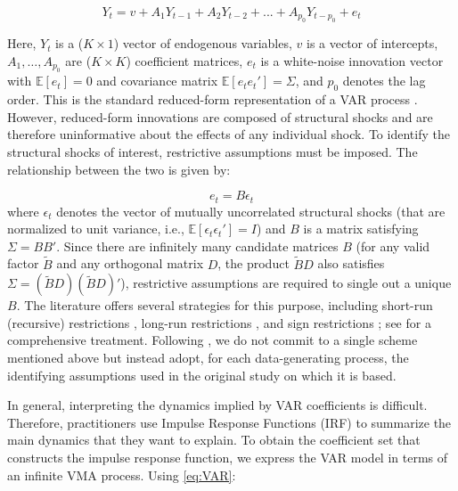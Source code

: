 \documentclass[12pt, a4paper]{article}
\begin{document}
\begin{equation} \label{eq:VAR}
    Y_t = v + A_{1}Y_{t-1}+A_2Y_{t-2}+...+A_{p_0}Y_{t-p_0}+e_t
\end{equation}

Here, $Y_t$ is a ($K \times 1$) vector of endogenous variables, $v$ is a vector of intercepts, $A_1, \dots, A_{p_0}$ are ($K \times K$) coefficient matrices, $e_t$ is a white-noise innovation vector with $\mathbb{E}[e_t] = 0$ and covariance matrix $\mathbb{E}[e_t e_t'] = \Sigma$, and $p_0$ denotes the lag order. This is the standard reduced-form representation of a VAR process \citep{lutkepohlNewIntroductionMultiple2005,simsMacroeconomicsReality1980}. However, reduced-form innovations are composed of structural shocks and are therefore uninformative about the effects of any individual shock. To identify the structural shocks of interest, restrictive assumptions must be imposed. The relationship between the two is given by:

\begin{equation} \label{eq:VAR_error}
    e_t = B \epsilon_t
\end{equation}
where $\epsilon_t$ denotes the vector of mutually uncorrelated structural shocks (that are normalized to unit variance, i.e., $\mathbb{E}[\epsilon_t \epsilon_t'] = I$) and $B$ is a matrix satisfying $\Sigma = BB'$. Since there are infinitely many candidate matrices $B$ (for any valid factor $\tilde{B}$ and any orthogonal matrix $D$, the product $\tilde{B} D$ also satisfies $\Sigma = (\tilde{B} D)(\tilde{B} D)'$), restrictive assumptions are required to single out a unique $B$. The literature offers several strategies for this purpose, including short-run (recursive) restrictions \citep{simsMacroeconomicsReality1980,christianoMonetaryPolicyShocks1999}, long-run restrictions \citep{blanchardDynamicEffectsAggregate1989}, and sign restrictions \citep{faustRobustnessIdentifiedVAR1998, uhligWhatAreEffects2005,rubio-ramirezStructuralVectorAutoregressions2010}; see \citet{kilianStructuralVectorAutoregressive2017} for a comprehensive treatment. Following \citet{ivanovPractitionersGuideLag2005}, we do not commit to a single scheme mentioned above but instead adopt, for each data-generating process, the identifying assumptions used in the original study on which it is based.

In general, interpreting the dynamics implied by VAR coefficients is difficult. Therefore, practitioners use Impulse Response Functions (IRF) to summarize the main dynamics that they want to explain. To obtain the coefficient set that constructs the impulse response function, we express the VAR model in terms of an infinite VMA process. Using \eqref{eq:VAR}:
\end{document}

